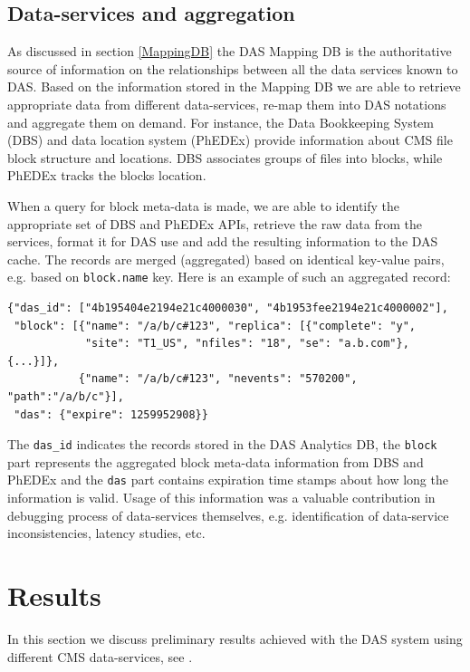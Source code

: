 \documentclass[3p,times]{elsarticle}
\begin{document}
\subsection{Data-services and aggregation}
As discussed in section \ref{MappingDB} the DAS Mapping DB 
is the authoritative source of information on the relationships between 
all the data services known to DAS.
Based on the information stored in the Mapping DB we are able to 
retrieve appropriate data from different data-services, re-map them into 
DAS notations and aggregate them on demand. For instance, the Data 
Bookkeeping System (DBS) \cite{DBS} and data location system (PhEDEx) \cite{PhEDEx}
provide information about CMS file block structure and locations.
DBS associates groups of files into blocks, while PhEDEx tracks the blocks
location. 

When a query for block meta-data is made, we are
able to identify the appropriate set of 
DBS and PhEDEx APIs, retrieve the raw data from the services, format it
for DAS use and add the resulting information to the DAS cache. The records
are merged (aggregated) based on identical key-value pairs, e.g.
based on \verb+block.name+ key. Here is an example of such an aggregated record:
\begin{verbatim}
{"das_id": ["4b195404e2194e21c4000030", "4b1953fee2194e21c4000002"], 
 "block": [{"name": "/a/b/c#123", "replica": [{"complete": "y", 
            "site": "T1_US", "nfiles": "18", "se": "a.b.com"}, {...}]},
           {"name": "/a/b/c#123", "nevents": "570200", "path":"/a/b/c"}],
 "das": {"expire": 1259952908}}
\end{verbatim}
The \verb+das_id+ indicates the records stored in the DAS Analytics DB,
the \verb+block+ part represents the aggregated block meta-data information from DBS
and PhEDEx and the \verb+das+ part contains expiration time stamps
about how long the information is valid.
Usage of this information was a valuable contribution in debugging process of
data-services themselves, e.g. identification of data-service inconsistencies, 
latency studies, etc.

\section{Results\label{Results}}
In this section we discuss preliminary results achieved with the DAS system
using different CMS data-services, see \cite{CMS, CMSDataModel}.
\end{document}
